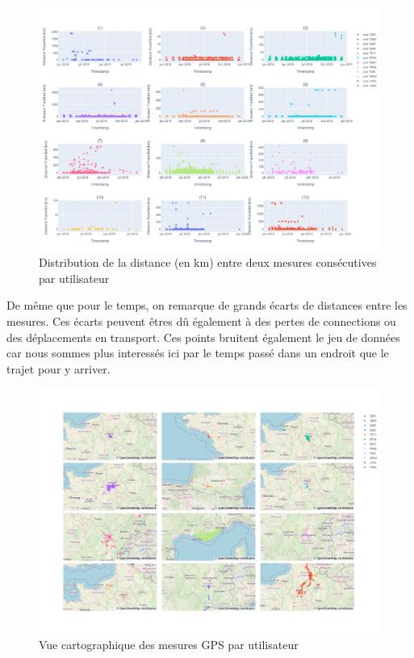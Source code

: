 \documentclass[10pt,a4paper]{article}
\begin{document}
\begin{figure}[H]
    \includegraphics[scale=0.3]{distance_travelled}
    \centering
    \caption{Distribution de la distance (en km) entre deux mesures consécutives par utilisateur}
    \label{fig:figure9}
\end{figure}

De même que pour le temps, on remarque de grands écarts de distances entre les mesures.
Ces écarts peuvent êtres dû également à des pertes de connections ou des déplacements en transport.
Ces points bruitent également le jeu de données car nous sommes plus interessés ici par le temps passé dans un endroit
que le trajet pour y arriver.

\begin{figure}[H]
    \includegraphics[scale=0.3]{map_view}
    \centering
    \caption{Vue cartographique des mesures GPS par utilisateur}
    \label{fig:figure10}
\end{figure}
\end{document}
